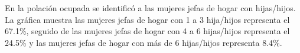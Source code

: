 En la polación ocupada se identificó a las mujeres jefas de hogar con hijas/hijos. La gráfica muestra las mujeres jefas de hogar con 1 a 3 hija/hijos representa el 67.1\%, seguido de las mujeres jefas de hogar con 4 a 6 hijas/hijos representa el 24.5\% y las mujeres jefas de hogar con más de 6 hijas/hijos representa 8.4\%. 